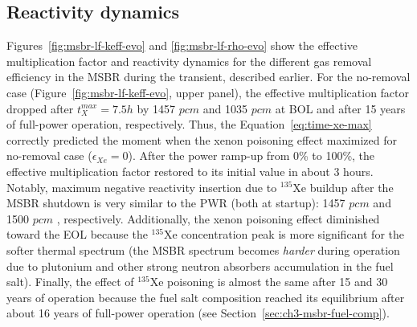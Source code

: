 \subsection{Reactivity dynamics}
Figures~\ref{fig:msbr-lf-keff-evo} and \ref{fig:msbr-lf-rho-evo} show the 
effective multiplication factor and reactivity dynamics for the 
different gas removal efficiency in the \gls{MSBR} during the transient, 
described earlier. For the no-removal case (Figure~\ref{fig:msbr-lf-keff-evo}, 
upper panel), the effective multiplication factor dropped after 
$t^{max}_X=7.5h$ by 1457 $pcm$ and 1035 $pcm$ at \gls{BOL} and after 15 years 
of full-power operation, respectively. Thus, the Equation~\ref{eq:time-xe-max} 
correctly predicted the moment when the xenon poisoning effect maximized for 
no-removal case ($\epsilon_{Xe}=0$).
After the power ramp-up from 0\% to 100\%, the effective multiplication factor 
restored to its initial value in about 3 hours. Notably, maximum 
negative reactivity insertion due to $^{135}$Xe buildup after the 
\gls{MSBR} shutdown is very similar to the \gls{PWR} (both at startup): 1457 
$pcm$ and 1500 $pcm$ \cite{rykhlevskii_impact_2019}, respectively. 
Additionally, the xenon poisoning effect diminished toward the \gls{EOL} 
because the $^{135}$Xe concentration peak is more significant for the softer 
thermal spectrum (the \gls{MSBR} spectrum becomes \emph{harder} during  
operation due to plutonium and other strong neutron absorbers accumulation in 
the fuel salt).
Finally, the effect of $^{135}$Xe poisoning is almost the same after 15 and 30 
years of operation because the fuel salt composition reached its equilibrium 
after about 16 years of full-power operation (see 
Section~\ref{sec:ch3-msbr-fuel-comp}).


